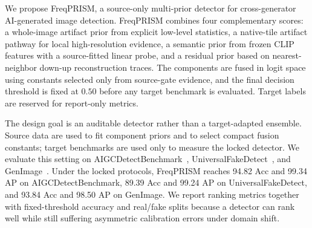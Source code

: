 \documentclass[lettersize,journal]{IEEEtran}
\begin{document}
We propose FreqPRISM, a source-only multi-prior detector for cross-generator AI-generated image detection. FreqPRISM combines four complementary scores: a whole-image artifact prior from explicit low-level statistics, a native-tile artifact pathway for local high-resolution evidence, a semantic prior from frozen CLIP features with a source-fitted linear probe, and a residual prior based on nearest-neighbor down-up reconstruction traces. The components are fused in logit space using constants selected only from source-gate evidence, and the final decision threshold is fixed at $0.50$ before any target benchmark is evaluated. Target labels are reserved for report-only metrics.

The design goal is an auditable detector rather than a target-adapted ensemble. Source data are used to fit component priors and to select compact fusion constants; target benchmarks are used only to measure the locked detector. We evaluate this setting on AIGCDetectBenchmark~\cite{zhong2023patchcraft}, UniversalFakeDetect~\cite{ojha2023univfd}, and GenImage~\cite{zhu2023genimage}. Under the locked protocols, FreqPRISM reaches 94.82 Acc and 99.34 AP on AIGCDetectBenchmark, 89.39 Acc and 99.24 AP on UniversalFakeDetect, and 93.84 Acc and 98.50 AP on GenImage. We report ranking metrics together with fixed-threshold accuracy and real/fake splits because a detector can rank well while still suffering asymmetric calibration errors under domain shift.
\end{document}
